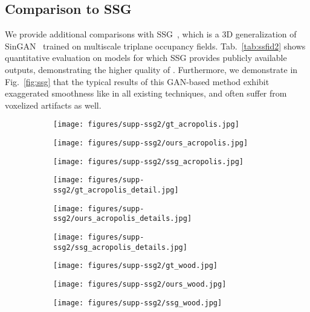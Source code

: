 \subsection{Comparison to SSG}
\label{sec:add_method}
We provide additional comparisons with SSG~\cite{wu2022learning}, which is a 3D generalization of SinGAN~\cite{shaham2019singan} trained on multiscale triplane occupancy fields. Tab.~\ref{tab:ssfid2} shows quantitative evaluation on models for which SSG provides publicly available outputs, demonstrating the higher quality of \ourmethod. Furthermore, we demonstrate in Fig.~\ref{fig:ssg} that the typical results of this GAN-based method exhibit exaggerated smoothness like in all existing techniques, and often suffer from voxelized artifacts as well.

\begin{figure}[!h]
\centering
 \begin{subfigure}{.32\linewidth}
        \centering
        \texttt{[image: figures/supp-ssg2/gt\_acropolis.jpg]}
    \end{subfigure}
    \begin{subfigure}{.32\linewidth}
        \centering
        \texttt{[image: figures/supp-ssg2/ours\_acropolis.jpg]}
    \end{subfigure}
    \begin{subfigure}{.32\linewidth}
        \centering
        \texttt{[image: figures/supp-ssg2/ssg\_acropolis.jpg]}
    \end{subfigure}

    \begin{subfigure}{.32\linewidth}
        \centering
        \texttt{[image: figures/supp-ssg2/gt\_acropolis\_detail.jpg]}
    \end{subfigure}
     \begin{subfigure}{.32\linewidth}
        \centering
        \texttt{[image: figures/supp-ssg2/ours\_acropolis\_details.jpg]}
    \end{subfigure}
    \begin{subfigure}{.32\linewidth}
        \centering
        \texttt{[image: figures/supp-ssg2/ssg\_acropolis\_details.jpg]}
    \end{subfigure}
    
 \begin{subfigure}{.32\linewidth}
        \centering
        \texttt{[image: figures/supp-ssg2/gt\_wood.jpg]}
    \end{subfigure}
    \begin{subfigure}{.32\linewidth}
        \centering
        \texttt{[image: figures/supp-ssg2/ours\_wood.jpg]}
    \end{subfigure}
    \begin{subfigure}{.32\linewidth}
        \centering
        \texttt{[image: figures/supp-ssg2/ssg\_wood.jpg]}
    \end{subfigure}


\end{figure}
